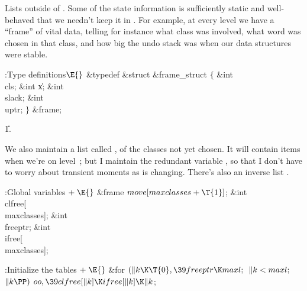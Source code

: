 Lists outside of . Some of the state information is
sufficiently
static and well-behaved that we needn't keep it in . For example,
at every level we have a ``frame'' of vital data, telling for instance
what class was involved, what word was chosen in that class, and how big
the undo stack was when our data structures were stable.

\Y\B\4:Type definitions\X${}\E{}$\6
\&{typedef} \&{struct} \&{frame\_struct} ${}\{{}$\1\6
\&{int} \\{cls};\6
\&{int} \|x;\6
\&{int} \\{slack};\6
\&{int} \\{uptr};\2\6
${}\}{}$ \&{frame};\par
\U1.\fi

We also maintain a list called , of the classes not yet
chosen.
It will contain  items when we're on level~; but I
maintain the
redundant variable , so that I don't have to worry about
transient moments as  is changing. There's also
an inverse list .

\Y\B\4:Global variables\X${}\mathrel+\E{}$\6
\&{frame} ${}\\{move}[\\{maxclasses}+\T{1}]{}$;\6
\&{int} \\{clfree}[\\{maxclasses}];\6
\&{int} \\{freeptr};\6
\&{int} \\{ifree}[\\{maxclasses}];%
\par
\fi

\B{}:Initialize the tables\X${}\mathrel+\E{}$\6
\&{for} ${}(\|k\K\T{0},\39\\{freeptr}\K\\{maxl};{}$ ${}\|k<\\{maxl};{}$ ${}\|k%
\PP){}$\1\5
${}\\{oo},\39\\{clfree}[\|k]\K\\{ifree}[\|k]\K\|k{}$;\2\par
\fi

